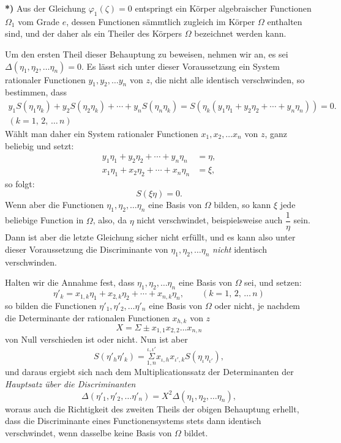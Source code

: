 \documentclass{article}
\begin{document}
\textbf{*)} Aus der Gleichung $\varphi_{1}(\zeta) = 0$ entspringt ein Körper algebraischer Functionen $\Omega_{1}$ vom Grade $e$, dessen Functionen sämmtlich zugleich im Körper $\Omega$ enthalten sind, und der daher als ein Theiler des Körpers $\Omega$ bezeichnet werden kann.


Um den ersten Theil dieser Behauptung zu beweisen, nehmen wir an, es sei $\Delta(\eta_{1}, \eta_{2}, \ldots \eta_{n}) = 0$. Es lässt sich unter dieser Voraussetzung ein System rationaler Functionen $y_{1}, y_{2}, \ldots y_{n}$ von $z$, die nicht alle identisch verschwinden, so bestimmen, dass
\[ \begin{gathered} y_{1}S(\eta_{1}\eta_{k}) + y_{2}S(\eta_{2}\eta_{k}) + \cdots + y_{n}S(\eta_{n}\eta_{k}) = S(\eta_{k}(y_{1}\eta_{1} + y_{2}\eta_{2} + \cdots + y_{n}\eta_{n})) = 0. \\ {\scriptstyle (k = 1,\, 2,\, \ldots\, n)} \end{gathered} \]
Wählt man daher ein System rationaler Functionen $x_{1}, x_{2}, \ldots x_{n}$ von $z$, ganz beliebig und setzt:
\[ \begin{aligned} y_{1}\eta_{1} + y_{2}\eta_{2} + \cdots + y_{n}\eta_{n} &= \eta, \\ x_{1}\eta_{1} + x_{2}\eta_{2} + \cdots + x_{n}\eta_{n} &= \xi, \end{aligned} \]
so folgt:
\[ S(\xi\eta) = 0. \]
Wenn aber die Functionen $\eta_{1}, \eta_{2}, \ldots \eta_{n}$ eine Basis von $\Omega$ bilden, so kann $\xi$ jede beliebige Function in $\Omega$, also, da $\eta$ nicht verschwindet, beispielsweise auch $\dfrac{1}{\eta}$ sein. Dann ist aber die letzte Gleichung sicher nicht erfüllt, und es kann also unter dieser Voraussetzung die Discriminante von $\eta_{1}, \eta_{2}, \ldots \eta_{n}$ \emph{nicht} identisch verschwinden.

Halten wir die Annahme fest, dass $\eta_{1}, \eta_{2}, \ldots \eta_{n}$ eine Basis von $\Omega$ sei, und setzen:
\[ \eta'_{k} = x_{1,k}\eta_{1} + x_{2,k}\eta_{2} + \cdots + x_{n,k}\eta_{n}, \qquad {\scriptstyle (k = 1,\, 2,\, \ldots\, n)} \]
so bilden die Functionen $\eta'_{1}, \eta'_{2}, \ldots \eta'_{n}$ eine Basis von $\Omega$ oder nicht, je nachdem die Determinante der rationalen Functionen $x_{h,k}$ von $z$
\[ X = \Sigma \pm x_{1,1}x_{2,2} \ldots x_{n,n} \]
von Null verschieden ist oder nicht. Nun ist aber
\[ S(\eta'_{h}\eta'_{k}) = \overset{\iota,\iota'}{\underset{1,n}{\Sigma}} x_{\iota,h}x_{\iota',k}S(\eta_{\iota}\eta_{\iota'}), \]
und daraus ergiebt sich nach dem Multiplicationssatz der Determinanten der \emph{Hauptsatz über die Discriminanten}
\[ \Delta(\eta'_{1}, \eta'_{2}, \ldots \eta'_{n}) = X^{2}\Delta(\eta_{1}, \eta_{2}, \ldots \eta_{n}), \tag{13.} \]
woraus auch die Richtigkeit des zweiten Theils der obigen Behauptung erhellt, dass die Discriminante eines Functionensystems stets dann identisch verschwindet, wenn dasselbe keine Basis von $\Omega$ bildet.
\end{document}
